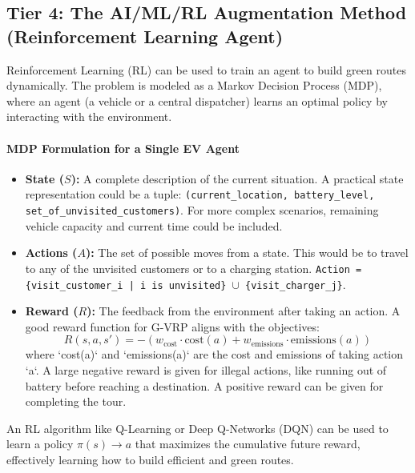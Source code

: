 \documentclass{article}
\begin{document}
\subsection{Tier 4: The AI/ML/RL Augmentation Method (Reinforcement Learning Agent)}
Reinforcement Learning (RL) can be used to train an agent to build green routes dynamically. The problem is modeled as a Markov Decision Process (MDP), where an agent (a vehicle or a central dispatcher) learns an optimal policy by interacting with the environment.

\paragraph{MDP Formulation for a Single EV Agent}
\begin{itemize}
    \item \textbf{State ($S$):} A complete description of the current situation. A practical state representation could be a tuple:
    \texttt{(current\_location, battery\_level, set\_of\_unvisited\_customers)}. For more complex scenarios, remaining vehicle capacity and current time could be included.
    
    \item \textbf{Actions ($A$):} The set of possible moves from a state. This would be to travel to any of the unvisited customers or to a charging station. \texttt{Action = \{visit\_customer\_i | i is unvisited\} $\cup$ \{visit\_charger\_j\}}.
    
    \item \textbf{Reward ($R$):} The feedback from the environment after taking an action. A good reward function for G-VRP aligns with the objectives:
    \begin{equation*}
    R(s, a, s') = - \left( w_{\text{cost}} \cdot \text{cost}(a) + w_{\text{emissions}} \cdot \text{emissions}(a) \right)
    \end{equation*}
    where `cost(a)` and `emissions(a)` are the cost and emissions of taking action `a`. A large negative reward is given for illegal actions, like running out of battery before reaching a destination. A positive reward can be given for completing the tour.
\end{itemize}

An RL algorithm like Q-Learning or Deep Q-Networks (DQN) can be used to learn a policy $\pi(s) \rightarrow a$ that maximizes the cumulative future reward, effectively learning how to build efficient and green routes.
\end{document}
